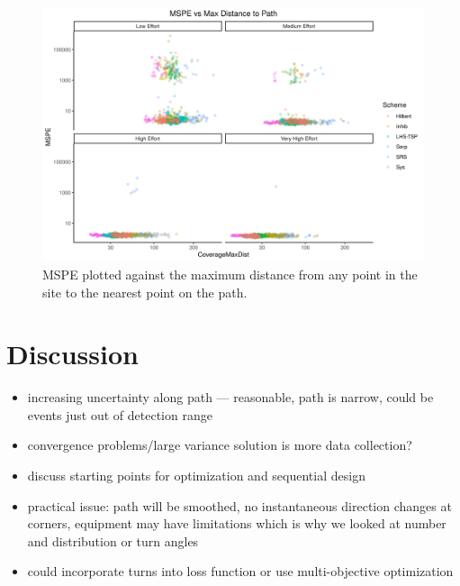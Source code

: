 \documentclass[review]{elsarticle}
\begin{document}
\begin{figure}
\includegraphics[width=5in]{../graphics/MSPE-Coverage-LGCP000004.png}

\caption{MSPE plotted against the maximum distance from any point in the site
to the nearest point on the path.}
\label{covg}
\end{figure}



\section{Discussion}

\begin{itemize}
\item increasing uncertainty along path --- reasonable, path is narrow, could
be events just out of detection range

\item convergence problems/large variance solution is more data collection?

\item discuss starting points for optimization and sequential design

\item practical issue: path will be smoothed, no instantaneous direction
changes at corners, equipment may have limitations which is why we looked at
number and distribution or turn angles

\item could incorporate turns into loss function or use multi-objective
optimization~\citep{lark}
\end{itemize}
\end{document}
